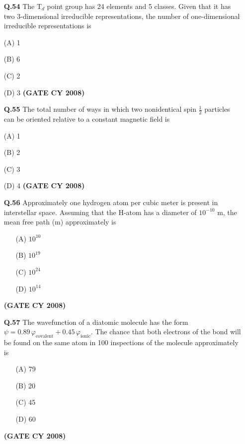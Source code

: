 \documentclass[12pt]{article}
\begin{document}
\begin{enumerate}
\textbf{Q.54} The T$_d$ point group has 24 elements and 5 classes. Given that it has two 3-dimensional irreducible representations, the number of one-dimensional irreducible representations is

\item[(A)] 1
\item[(B)] 6
\item[(C)] 2
\item[(D)] 3   \textbf{(GATE CY 2008)}


\vspace{0.5cm}

\textbf{Q.55} The total number of ways in which two nonidentical spin $\frac{1}{2}$ particles can be oriented relative to a constant magnetic field is

\item[(A)] 1
\item[(B)] 2
\item[(C)] 3
\item[(D)] 4   \textbf{(GATE CY 2008)}


\textbf{Q.56} Approximately one hydrogen atom per cubic meter is present in interstellar space. Assuming that the H-atom has a diameter of $10^{-10}$ m, the mean free path (m) approximately is

\begin{enumerate}
\item[(A)] $10^{10}$
\item[(B)] $10^{19}$
\item[(C)] $10^{24}$
\item[(D)] $10^{14}$
\end{enumerate}   \textbf{(GATE CY 2008)}


\vspace{0.5cm}

\textbf{Q.57} The wavefunction of a diatomic molecule has the form $\psi = 0.89\, \varphi_{\text{covalent}} + 0.45\, \varphi_{\text{ionic}}$. The chance that both electrons of the bond will be found on the same atom in 100 inspections of the molecule approximately is

\begin{enumerate}
\item[(A)] 79
\item[(B)] 20
\item[(C)] 45
\item[(D)] 60
\end{enumerate}   \textbf{(GATE CY 2008)}


\vspace{0.5cm}


\end{enumerate}
\end{document}
